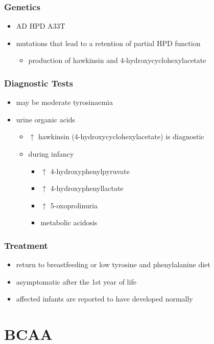 \documentclass[12pt]{scrartcl}
\begin{document}
\subsubsection{Genetics}
\label{sec:orge95a83a}
\begin{itemize}
\item AD HPD A33T
\item mutations that lead to a retention of partial HPD function
\begin{itemize}
\item production of hawkinsin and 4-hydroxycyclohexylacetate
\end{itemize}
\end{itemize}
\subsubsection{Diagnostic Tests}
\label{sec:orgfb35850}
\begin{itemize}
\item may be moderate tyrosinaemia
\item urine organic acids
\begin{itemize}
\item \(\uparrow\) hawkinsin (4-hydroxycyclohexylacetate) is diagnostic
\item during infancy
\begin{itemize}
\item \(\uparrow\) 4-hydroxyphenylpyruvate
\item \(\uparrow\) 4-hydroxyphenyllactate
\item \(\uparrow\) 5-oxoprolinuria
\item metabolic acidosis
\end{itemize}
\end{itemize}
\end{itemize}

\subsubsection{Treatment}
\label{sec:orgbf4e673}
\begin{itemize}
\item return to breastfeeding or low tyrosine and phenylalanine diet
\item asymptomatic after the 1st year of life
\item affected infants are reported to have developed normally
\end{itemize}

\section{BCAA}
\label{sec:org268212f}
\end{document}

